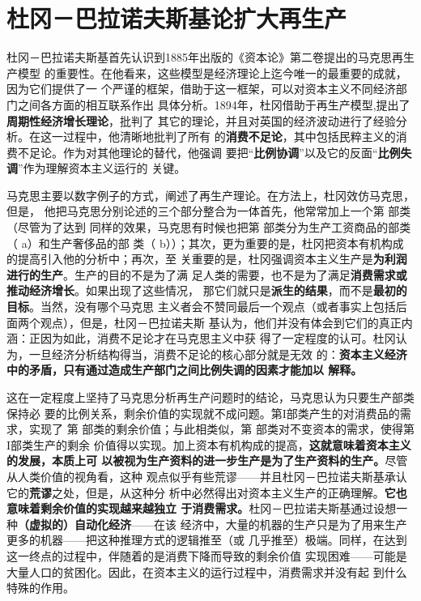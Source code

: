 \section{杜冈－巴拉诺夫斯基论扩大再生产}
杜冈－巴拉诺夫斯基首先认识到1885年出版的《资本论》第二卷提出的马克思再生产模型
的重要性。在他看来，这些模型是经济理论上迄今唯一的最重要的成就，因为它们提供了一
个严谨的框架，借助于这一框架，可以对资本主义不同经济部门之间各方面的相互联系作出
具体分析。1894年，杜冈借助于再生产模型,提出了\textbf{周期性经济增长理论}，批判了
其它的理论，并且对英国的经济波动进行了经验分析。在这一过程中，他清晰地批判了所有
的\textbf{消费不足论}，其中包括民粹主义的消费不足论。作为对其他理论的替代，他强调
要把“\textbf{比例协调}”以及它的反面“\textbf{比例失调}”作为理解资本主义运行的
关键。

马克思主要以数字例子的方式，阐述了再生产理论。在方法上，杜冈效仿马克思，但是，
他把马克思分别论述的三个部分整合为一体首先，他常常加上一个第 部类（尽管为了达到
同样的效果，马克思有时候也把第 部类分为生产工资商品的部类（ a）和生产奢侈品的部
类（ b））；其次，更为重要的是，杜冈把资本有机构成的提高引入他的分析中；再次，至
关重要的是，杜冈强调资本主义生产是\textbf{为利润进行的生产}。生产的目的不是为了满
足人类的需要，也不是为了满足\textbf{消费需求或推动经济增长}。如果出现了这些情况，
那它们就只是\textbf{派生的结果}，而不是\textbf{最初的目标}。当然，没有哪个马克思
主义者会不赞同最后一个观点（或者事实上包括后面两个观点），但是，杜冈－巴拉诺夫斯
基认为，他们并没有体会到它们的真正内涵：正因为如此，消费不足论才在马克思主义中获
得了一定程度的认可。杜冈认为，一旦经济分析结构得当，消费不足论的核心部分就是无效
的：\textbf{资本主义经济中的矛盾，只有通过造成生产部门之间比例失调的因素才能加以
  解释。}

这在一定程度上坚持了马克思分析再生产问题时的结论，马克思认为只要生产部类保持必
要的比例关系，剩余价值的实现就不成问题。第Ι部类产生的对消费品的需求，实现了
第 部类的剩余价值；与此相类似，第 部类对不变资本的需求，使得第Ι部类生产的剩余
价值得以实现。加上资本有机构成的提高，\textbf{这就意味着资本主义的发展，本质上可
  以被视为生产资料的进一步生产是为了生产资料的生产。}尽管从人类价值的视角看，这种
观点似乎有些荒谬——并且杜冈－巴拉诺夫斯基承认它的\textbf{荒谬}之处，但是，从这种分
析中必然得出对资本主义生产的正确理解。\textbf{它也意味着剩余价值的实现越来越独立
  于消费需求。}杜冈－巴拉诺夫斯基通过设想一种\textbf{（虚拟的）自动化经济}——在该
经济中，大量的机器的生产只是为了用来生产更多的机器——把这种推理方式的逻辑推至（或
几乎推至）极端。同样，在达到这一终点的过程中，伴随着的是消费下降而导致的剩余价值
实现困难——可能是大量人口的贫困化。因此，在资本主义的运行过程中，消费需求并没有起
到什么特殊的作用。

